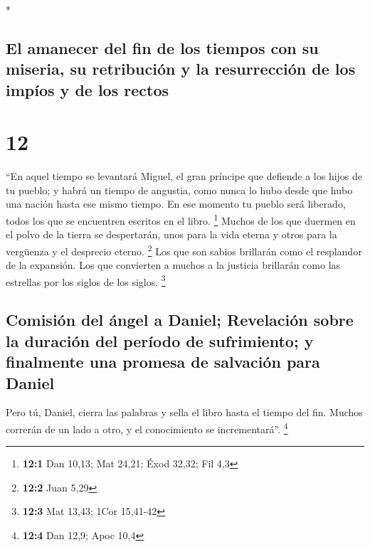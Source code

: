 \begin{paracol}{2}
\begin{otherlanguage}{english}
\end{otherlanguage}

\switchcolumn[0]*

\hypertarget{el-amanecer-del-fin-de-los-tiempos-con-su-miseria-su-retribuciuxf3n-y-la-resurrecciuxf3n-de-los-impuxedos-y-de-los-rectos}{%
\subsection{El amanecer del fin de los tiempos con su miseria, su
retribución y la resurrección de los impíos y de los
rectos}\label{el-amanecer-del-fin-de-los-tiempos-con-su-miseria-su-retribuciuxf3n-y-la-resurrecciuxf3n-de-los-impuxedos-y-de-los-rectos}}

\hypertarget{section-22}{%
\section{12}\label{section-22}}

 ``En aquel tiempo se levantará Miguel, el gran príncipe
que defiende a los hijos de tu pueblo; y habrá un tiempo de angustia,
como nunca lo hubo desde que hubo una nación hasta ese mismo tiempo. En
ese momento tu pueblo será liberado, todos los que se encuentren
escritos en el libro. \footnote{\textbf{12:1} Dan 10,13; Mat 24,21; Éxod
  32,32; Fil 4,3}  Muchos de los que duermen en el polvo
de la tierra se despertarán, unos para la vida eterna y otros para la
vergüenza y el desprecio eterno. \footnote{\textbf{12:2} Juan 5,29}
 Los que son sabios brillarán como el resplandor de la
expansión. Los que convierten a muchos a la justicia brillarán como las
estrellas por los siglos de los siglos. \footnote{\textbf{12:3} Mat
  13,43; 1Cor 15,41-42}

\hypertarget{comisiuxf3n-del-uxe1ngel-a-daniel-revelaciuxf3n-sobre-la-duraciuxf3n-del-peruxedodo-de-sufrimiento-y-finalmente-una-promesa-de-salvaciuxf3n-para-daniel}{%
\subsection{Comisión del ángel a Daniel; Revelación sobre la duración
del período de sufrimiento; y finalmente una promesa de salvación para
Daniel}\label{comisiuxf3n-del-uxe1ngel-a-daniel-revelaciuxf3n-sobre-la-duraciuxf3n-del-peruxedodo-de-sufrimiento-y-finalmente-una-promesa-de-salvaciuxf3n-para-daniel}}

 Pero tú, Daniel, cierra las palabras y sella el libro
hasta el tiempo del fin. Muchos correrán de un lado a otro, y el
conocimiento se incrementará''. \footnote{\textbf{12:4} Dan 12,9; Apoc
  10,4}


\end{paracol}

